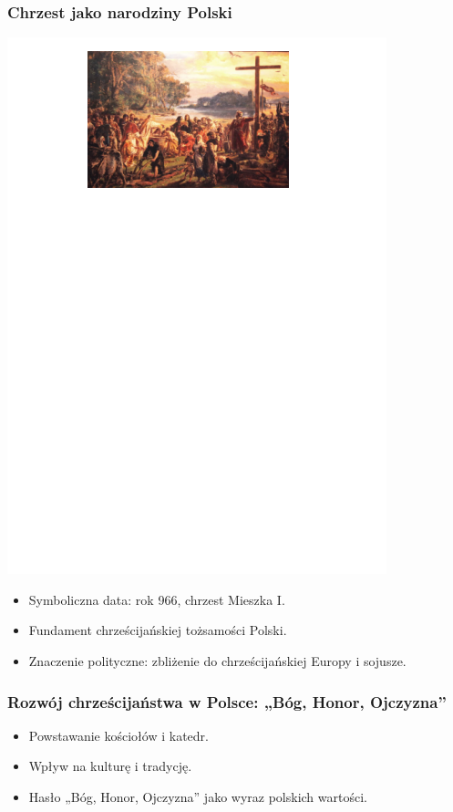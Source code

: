 \documentclass{beamer}
\begin{document}
\begin{frame}
    \frametitle{Chrzest jako narodziny Polski}
    \includegraphics{grafika1.png}
    \begin{itemize}
        \item Symboliczna data: rok 966, chrzest Mieszka I.
        \item Fundament chrześcijańskiej tożsamości Polski.
        \item Znaczenie polityczne: zbliżenie do chrześcijańskiej Europy i sojusze.
    \end{itemize}
\end{frame}

\begin{frame}
    \frametitle{Rozwój chrześcijaństwa w Polsce: „Bóg, Honor, Ojczyzna”}
    \begin{itemize}
        \item Powstawanie kościołów i katedr.
        \item Wpływ na kulturę i tradycję.
        \item Hasło „Bóg, Honor, Ojczyzna” jako wyraz polskich wartości.
    \end{itemize}
\end{frame}
\end{document}

